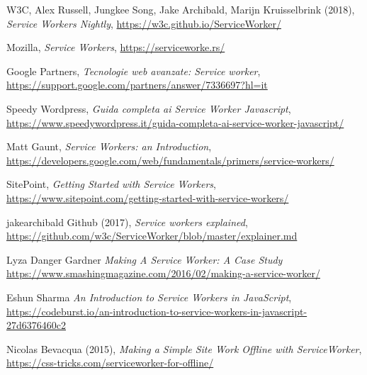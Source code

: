 \documentclass[11pt ,a4paper , twoside , openright ]{article}
\begin{document}
\begin{thebibliography}{99}
	\bibitem{}
	W3C, Alex Russell, Jungkee Song, Jake Archibald, Marijn Kruisselbrink (2018),
	\emph{Service Workers Nightly},
	\url{https://w3c.github.io/ServiceWorker/}
	
	\bibitem{}
	Mozilla,
	\emph{Service Workers},
	\url{https://serviceworke.rs/}
	
	\bibitem{}
	Google Partners,
	\emph{Tecnologie web avanzate: Service worker},
	\url{https://support.google.com/partners/answer/7336697?hl=it}
	
	\bibitem{}
	Speedy Wordpress,
	\emph{Guida completa ai Service Worker Javascript},
	\url{https://www.speedywordpress.it/guida-completa-ai-service-worker-javascript/}
	
	\bibitem{}
	Matt Gaunt,
	\emph{Service Workers: an Introduction},
	\url{https://developers.google.com/web/fundamentals/primers/service-workers/}
	
	\bibitem{}
	SitePoint,
	\emph{Getting Started with Service Workers},
	\url{https://www.sitepoint.com/getting-started-with-service-workers/}
	
	\bibitem{}
	jakearchibald Github (2017),
	\emph{Service workers explained},
	\url{https://github.com/w3c/ServiceWorker/blob/master/explainer.md}
	
	\bibitem{}
	Lyza Danger Gardner
	\emph{Making A Service Worker: A Case Study}
	\url{https://www.smashingmagazine.com/2016/02/making-a-service-worker/}
	
	\bibitem{}
	Eshun Sharma
	\emph{An Introduction to Service Workers in JavaScript},
	\url{https://codeburst.io/an-introduction-to-service-workers-in-javascript-27d6376460c2}
	
	\bibitem{}
	Nicolas Bevacqua (2015), 
	\emph{Making a Simple Site Work Offline with ServiceWorker},
	\url{https://css-tricks.com/serviceworker-for-offline/}
\end{thebibliography}
\newpage
\listoffigures
\end{document}
